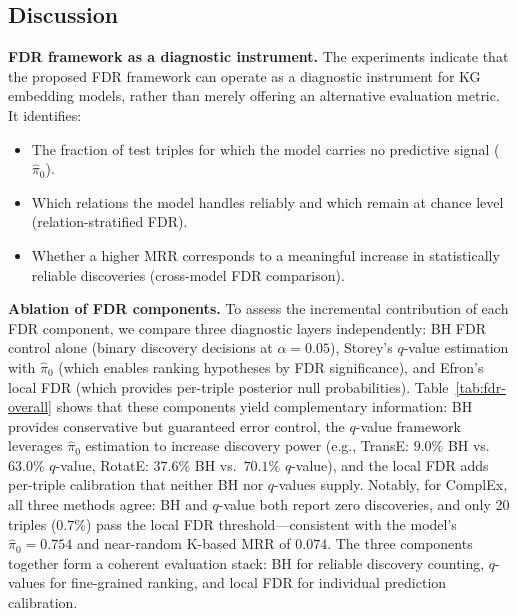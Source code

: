 \subsection{Discussion}
\label{subsec:discussion}

\textbf{FDR framework as a diagnostic instrument.}
The experiments indicate that the proposed FDR framework can operate as a diagnostic instrument for KG embedding models, rather than merely offering an alternative evaluation metric.
It identifies:
\begin{itemize}
    \item The fraction of test triples for which the model carries no predictive signal ($\hat{\pi}_0$).
    \item Which relations the model handles reliably and which remain at chance level (relation-stratified FDR).
    \item Whether a higher MRR corresponds to a meaningful increase in statistically reliable discoveries (cross-model FDR comparison).
\end{itemize}

\textbf{Ablation of FDR components.}
To assess the incremental contribution of each FDR component, we compare three diagnostic layers independently: BH FDR control alone (binary discovery decisions at $\alpha = 0.05$), Storey's $q$-value estimation with $\hat{\pi}_0$ (which enables ranking hypotheses by FDR significance), and Efron's local FDR (which provides per-triple posterior null probabilities). Table~\ref{tab:fdr-overall} shows that these components yield complementary information: BH provides conservative but guaranteed error control, the $q$-value framework leverages $\hat{\pi}_0$ estimation to increase discovery power (e.g., TransE: $9.0\%$ BH vs.\ $63.0\%$ $q$-value, RotatE: $37.6\%$ BH vs.\ $70.1\%$ $q$-value), and the local FDR adds per-triple calibration that neither BH nor $q$-values supply. Notably, for ComplEx, all three methods agree: BH and $q$-value both report zero discoveries, and only 20 triples ($0.7\%$) pass the local FDR threshold---consistent with the model's $\hat{\pi}_0 = 0.754$ and near-random K-based MRR of $0.074$. The three components together form a coherent evaluation stack: BH for reliable discovery counting, $q$-values for fine-grained ranking, and local FDR for individual prediction calibration.

